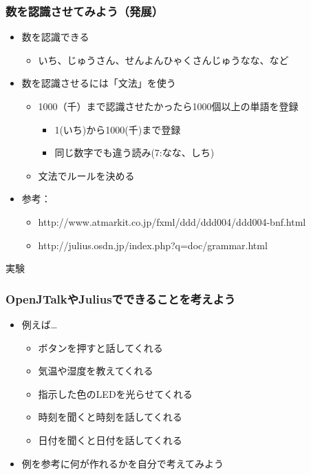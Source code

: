 \documentclass[14pt]{beamer}
\begin{document}
\begin{frame}
  \frametitle{数を認識させてみよう（発展）}
  \begin{itemize}
    \item 数を認識できる
    \begin{itemize}
      \item いち、じゅうさん、せんよんひゃくさんじゅうなな、など
    \end{itemize}
    \item 数を認識させるには「文法」を使う
    \begin{itemize}
      \item 1000（千）まで認識させたかったら1000個以上の単語を登録
      \begin{itemize}
        \item 1(いち)から1000(千)まで登録
        \item 同じ数字でも違う読み(7:なな、しち)
      \end{itemize}
      \item 文法でルールを決める
    \end{itemize}
    \item 参考：
    \begin{itemize}
      \item http://www.atmarkit.co.jp/fxml/ddd/ddd004/ddd004-bnf.html
      \item http://julius.osdn.jp/index.php?q=doc/grammar.html
    \end{itemize}
  \end{itemize}
\end{frame}

\begin{frame}
  \centering
  実験
\end{frame}

\begin{frame}
  \frametitle{OpenJTalkやJuliusでできることを考えよう}
  \begin{itemize}
    \item 例えば…
    \begin{itemize}
      \item ボタンを押すと話してくれる
      \item 気温や湿度を教えてくれる
      \item 指示した色のLEDを光らせてくれる
      \item 時刻を聞くと時刻を話してくれる
      \item 日付を聞くと日付を話してくれる
    \end{itemize}
    \item 例を参考に何が作れるかを自分で考えてみよう
  \end{itemize}
\end{frame}
\end{document}
